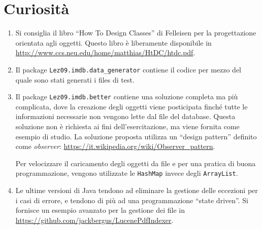 \documentclass[]{scrartcl}
\begin{document}
\section*{Curiosità}

\begin{enumerate}
\item Si consiglia il libro ``How To Design Classes'' di  Felleisen per la progettazione orientata agli oggetti. Questo libro è liberamente disponibile in \url{http://www.ccs.neu.edu/home/matthias/HtDC/htdc.pdf}. 

\item Il package \texttt{Lez09.imdb.data\_generator} contiene il codice per mezzo del quale sono stati generati i files di test. 

\item Il package \texttt{Lez09.imdb.better} contiene una soluzione completa ma più complicata, dove la creazione degli oggetti viene posticipata finché tutte le informazioni necessarie non vengono lette dal file del database. Questa soluzione  non è richiesta ai fini dell'esercitazione, ma viene fornita come esempio di studio. La soluzione proposta utilizza un ``design pattern'' definito come \textit{observer}: \url{https://it.wikipedia.org/wiki/Observer_pattern}.

Per velocizzare il caricamento degli oggetti da file e per una pratica di buona programmazione, vengono utilizzate le \texttt{HashMap} invece degli \texttt{ArrayList}.

\item Le ultime versioni di Java tendono ad eliminare la gestione delle eccezioni per i casi di errore, e tendono di più ad una programmazione ``state driven''. Si fornisce un esempio avanzato per la gestione dei file in \url{https://github.com/jackbergus/LucenePdfIndexer}. 
\end{enumerate}
\end{document}
